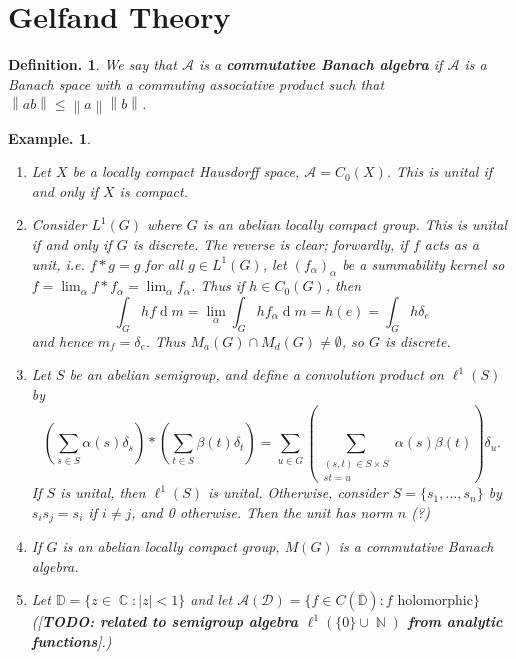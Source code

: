\documentclass[11pt, a4paper]{memoir}
\DeclareMathOperator{\N}{{\mathbb{N}}}
\DeclareMathOperator{\C}{{\mathbb{C}}}
\newcommand{\norm}[1]{\ensuremath{\left\lVert#1\right\rVert}}
\theoremstyle{change}
\theoremstyle{plain}
\theoremstyle{nonumberplain}
\newtheorem{definition}{Definition.}
\newtheorem{example}{Example.}
\renewcommand{\d}[1]{\ensuremath{\operatorname{d}\!{#1}}}
\newcommand{\defn}[1]{{\boldmath\bfseries #1}}
\newcommand{\TODO}[1]{[\textit{\textbf{TODO: #1}}]}
\numberwithin{equation}{section}
\begin{document}
\section{Gelfand Theory}
\begin{definition}
    We say that $\mathcal{A}$ is a \defn{commutative Banach algebra} if $\mathcal{A}$ is a Banach space with a commuting associative product such that $\norm{ab}\leq\norm{a}\norm{b}$.
\end{definition}
\begin{example}
    \begin{enumerate}[nl,r]
        \item Let $X$ be a locally compact Hausdorff space, $\mathcal{A}=C_0(X)$.
            This is unital if and only if $X$ is compact.
        \item Consider $L^1(G)$ where $G$ is an abelian locally compact group.
            This is unital if and only if $G$ is discrete.
            The reverse is clear; forwardly, if $f$ acts as a unit, i.e. $f*g=g$ for all $g\in L^1(G)$, let $(f_\alpha)_\alpha$ be a summability kernel so $f=\lim_\alpha f*f_\alpha=\lim_\alpha f_\alpha$.
            Thus if $h\in C_0(G)$, then
            \begin{equation*}
                \int_G hf\d{m}=\lim_\alpha\int_G hf_\alpha\d{m}=h(e)=\int_G h\delta_e
            \end{equation*}
            and hence $m_f=\delta_e$.
            Thus $M_a(G)\cap M_d(G)\neq\emptyset$, so $G$ is discrete.
        \item Let $S$ be an abelian semigroup, and define a convolution product on $\ell^1(S)$ by
            \begin{equation*}
                \left(\sum_{s\in S}\alpha(s)\delta_s\right)*\left(\sum_{t\in S}\beta(t)\delta_t\right)=\sum_{u\in G}\left(\sum_{\substack{(s,t)\in S\times S\\st=u}}\alpha(s)\beta(t)\right)\delta_u.
            \end{equation*}
            If $S$ is unital, then $\ell^1(S)$ is unital.
            Otherwise, consider $S=\{s_1,\ldots,s_n\}$ by $s_is_j=s_i$ if $i\neq j$, and 0 otherwise.
            Then the unit has norm $n$ (?)
        \item If $G$ is an abelian locally compact group, $M(G)$ is a commutative Banach algebra.
        \item Let $\mathbb{D}=\{z\in\C:|z|<1\}$ and let $\mathcal{A}(\mathcal{D})=\{f\in C(\overline{\mathbb{D}}):f\text{ holomorphic}\}$ (\TODO{related to semigroup algebra $\ell^1(\{0\}\cup\N)$ from analytic functions}.)
    \end{enumerate}
\end{example}
\end{document}
